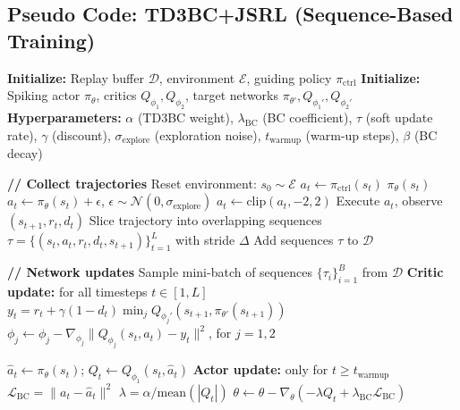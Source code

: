\subsection{Pseudo Code: TD3BC+JSRL (Sequence-Based Training)}\label{sup:pseudo}
\begin{algorithm}[H]
\caption{TD3BC+JSRL for Online Spiking Policy Training}
\begin{algorithmic}[1]
\State \textbf{Initialize:} Replay buffer $\mathcal{D}$, environment $\mathcal{E}$, guiding policy $\pi_{\text{ctrl}}$
\State \textbf{Initialize:} Spiking actor $\pi_\theta$, critics $Q_{\phi_1}, Q_{\phi_2}$, target networks $\pi_{\theta'}, Q_{\phi_1'}, Q_{\phi_2'}$
\State \textbf{Hyperparameters:} $\alpha$ (TD3BC weight), $\lambda_{\text{BC}}$ (BC coefficient), $\tau$ (soft update rate), $\gamma$ (discount), $\sigma_{\text{explore}}$ (exploration noise), $t_{\text{warmup}}$ (warm-up steps), $\beta$ (BC decay)

    \State \textbf{// Collect trajectories}
        \State Reset environment: $s_0 \sim \mathcal{E}$
                \State $a_t \leftarrow \pi_{\text{ctrl}}(s_t)$ 
                \State $\pi_\theta(s_t)$ 
            \Else
                \State $a_t \leftarrow \pi_\theta(s_t) + \epsilon$, $\epsilon \sim \mathcal{N}(0, \sigma_{\text{explore}})$
                \State $a_t \leftarrow \text{clip}(a_t, -2, 2)$
            \EndIf
            \State Execute $a_t$, observe $(s_{t+1}, r_t, d_t)$
        \EndFor
        \State Slice trajectory into overlapping sequences $\tau = \{(s_t, a_t, r_t, d_t, s_{t+1})\}_{t=1}^{L}$ with stride $\Delta$
        \State Add sequences $\tau$ to $\mathcal{D}$
    \EndFor

    \State \textbf{// Network updates}
        \State Sample mini-batch of sequences $\{\tau_i\}_{i=1}^{B}$ from $\mathcal{D}$
            \State \textbf{Critic update:} for all timesteps $t \in [1, L]$
            \State \quad $y_t = r_t + \gamma(1 - d_t)\min_j Q_{\phi_j'}(s_{t+1}, \pi_{\theta'}(s_{t+1}))$
            \State \quad $\phi_j \leftarrow \phi_j - \nabla_{\phi_j}\|Q_{\phi_j}(s_t, a_t) - y_t\|^2$, for $j = 1,2$
            
            \State $\hat{a}_t \leftarrow \pi_\theta(s_t)$; \quad $Q_t \leftarrow Q_{\phi_1}(s_t, \hat{a}_t)$
            \State \textbf{Actor update:} only for $t \ge t_{\text{warmup}}$
            \State \quad $\mathcal{L}_{\text{BC}} = \|a_t - \hat{a}_t\|^2$
            \State \quad $\lambda = \alpha / \text{mean}(|Q_t|)$
            \State \quad $\theta \leftarrow \theta - \nabla_\theta(-\lambda Q_t + \lambda_{\text{BC}} \mathcal{L}_{\text{BC}})$
        \EndFor


\end{algorithmic}
\end{algorithm}
